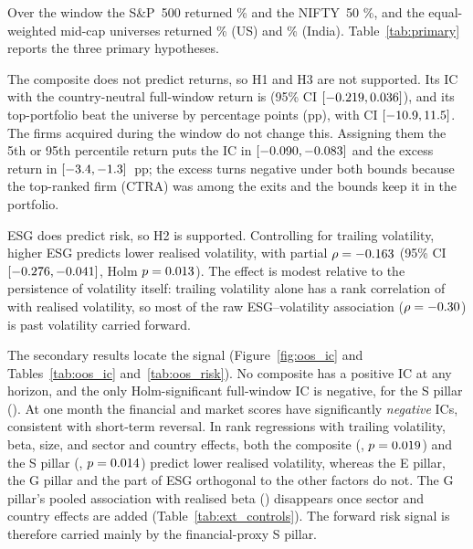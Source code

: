 Over the window the S\&P~500 returned \IdxRetUS\% and the NIFTY~50
\IdxRetIndia\%, and the equal-weighted mid-cap universes returned
\UnivRetUS\% (US) and \UnivRetIndia\% (India). Table~\ref{tab:primary}
reports the three primary hypotheses.

\begin{table}[t]
\centering
\caption{Primary hypotheses (one-sided tests, Holm-adjusted across H1--H3;
$N=\NOOS$ firms with a full-window return).}
\label{tab:primary}
\scriptsize
\setlength{\tabcolsep}{3pt}
\resizebox{\columnwidth}{!}{}
\end{table}

The composite does not predict returns, so H1 and H3 are not supported. Its
IC with the country-neutral full-window return is \HOneEst (95\% CI
$[-0.219,0.036]$), and its top-\TopN portfolio beat the universe by
\HThreeEst percentage points (pp), with CI $[-10.9,11.5]$. The
\NExited firms acquired during the window do not change this. Assigning them
the 5th or 95th percentile return puts the IC in
$[-0.090,-0.083]$ and the excess return in
$[-3.4,-1.3]$~pp; the excess turns negative under both bounds
because the top-ranked firm (CTRA) was among the exits and the bounds keep it
in the portfolio.

ESG does predict risk, so H2 is supported. Controlling for trailing
volatility, higher ESG predicts lower realised volatility, with partial
$\rho=-0.163$ (95\% CI $[-0.276,-0.041]$, Holm $p=0.013$). The effect
is modest relative to the persistence of volatility itself: trailing
volatility alone has a rank correlation of \RhoVolPersist with realised
volatility, so most of the raw ESG--volatility association
($\rho=-0.30$) is past volatility carried forward.

The secondary results locate the signal (Figure~\ref{fig:oos_ic} and
Tables~\ref{tab:oos_ic} and~\ref{tab:oos_risk}). No composite has a positive
IC at any horizon, and the only Holm-significant full-window IC is negative,
for the S pillar (\ICSFull). At one month the financial and market scores
have significantly \emph{negative} ICs, consistent with short-term reversal.
In rank regressions with trailing volatility, beta, size, and sector and
country effects, both the composite (\RegVolESG, $p=0.019$) and the S
pillar (\RegVolS, $p=0.014$) predict lower realised volatility, whereas
the E pillar, the G pillar and the part of ESG orthogonal to the other
factors do not. The G pillar's pooled association with realised beta
(\PartBetaG) disappears once sector and country effects are added
(Table~\ref{tab:ext_controls}). The forward risk signal is therefore carried
mainly by the financial-proxy S pillar.

